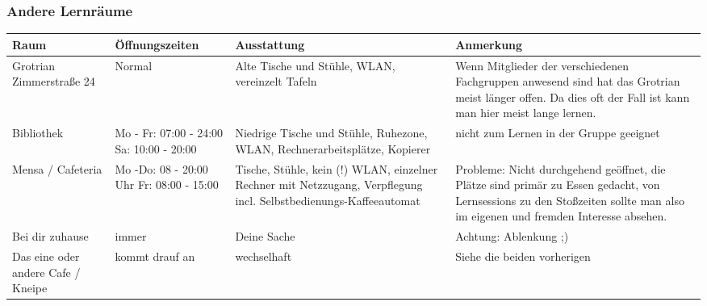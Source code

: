 	\subsubsection*{Andere Lernräume}
		\begin{tabular}{|p{4cm}|p{5cm}|p{3.6cm}|p{4cm}|}
 			\hline Raum & Öffnungszeiten & Ausstattung & Anmerkung  \\  
			\hline Grotrian  Zimmerstraße 24 & Normal  &
			Alte Tische und Stühle, WLAN, vereinzelt Tafeln & Wenn Mitglieder der verschiedenen Fachgruppen anwesend sind hat das Grotrian meist länger offen. Da dies oft der Fall ist kann man hier meist lange lernen. \\ 
			\hline Bibliothek & Mo - Fr: 07:00 - 24:00 Sa:
			10:00 - 20:00& Niedrige Tische und Stühle,
			Ruhezone, WLAN, Rechnerarbeits\-plätze, Kopierer &  nicht zum  Lernen in der Gruppe  geeignet \\ 
			\hline Mensa / Cafeteria & Mo -Do: 08 - 20:00 Uhr Fr: 08:00 - 15:00 & Tische, Stühle, kein (!) WLAN, einzelner Rechner mit Netzzugang, Verpflegung incl. Selbstbedienungs-Kaffeeautomat& Probleme: Nicht durchgehend geöffnet, die Plätze sind primär zu Essen gedacht, von Lernsessions zu den Stoßzeiten sollte man also im eigenen und fremden Interesse absehen. \\ 
			\hline Bei dir zuhause & immer & Deine Sache & Achtung: Ablenkung ;) \\ 
			\hline Das eine oder andere Cafe / Kneipe & kommt drauf an & wechselhaft &Siehe die beiden vorherigen \\
			\hline
		\end{tabular}
